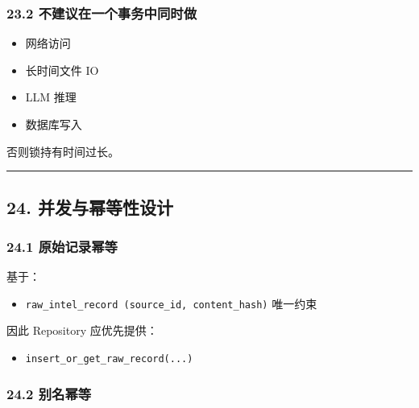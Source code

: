 \documentclass[UTF8]{ctexart}
\providecommand{\tightlist}{%
  \setlength{\itemsep}{0pt}\setlength{\parskip}{0pt}}
\begin{document}
\hypertarget{ux4e0dux5efaux8baeux5728ux4e00ux4e2aux4e8bux52a1ux4e2dux540cux65f6ux505a}{%
\subsubsection{23.2
不建议在一个事务中同时做}\label{ux4e0dux5efaux8baeux5728ux4e00ux4e2aux4e8bux52a1ux4e2dux540cux65f6ux505a}}

\begin{itemize}
\tightlist
\item
  网络访问
\item
  长时间文件 IO
\item
  LLM 推理
\item
  数据库写入
\end{itemize}

否则锁持有时间过长。

\begin{center}\rule{0.5\linewidth}{0.5pt}\end{center}

\hypertarget{ux5e76ux53d1ux4e0eux5e42ux7b49ux6027ux8bbeux8ba1}{%
\subsection{24.
并发与幂等性设计}\label{ux5e76ux53d1ux4e0eux5e42ux7b49ux6027ux8bbeux8ba1}}

\hypertarget{ux539fux59cbux8bb0ux5f55ux5e42ux7b49}{%
\subsubsection{24.1
原始记录幂等}\label{ux539fux59cbux8bb0ux5f55ux5e42ux7b49}}

基于：

\begin{itemize}
\tightlist
\item
  \texttt{raw\_intel\_record\ (source\_id,\ content\_hash)} 唯一约束
\end{itemize}

因此 Repository 应优先提供：

\begin{itemize}
\tightlist
\item
  \texttt{insert\_or\_get\_raw\_record(...)}
\end{itemize}

\hypertarget{ux522bux540dux5e42ux7b49}{%
\subsubsection{24.2 别名幂等}\label{ux522bux540dux5e42ux7b49}}
\end{document}
